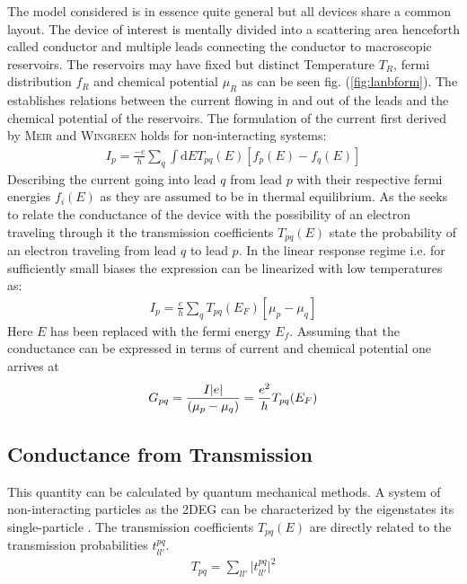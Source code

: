 The model considered is in essence quite general but all devices share a common layout. The device of interest is mentally divided into a scattering area henceforth called conductor and multiple leads connecting the conductor to macroscopic reservoirs. The reservoirs may have fixed but distinct Temperature $T_R$, fermi distribution $f_R$ and chemical potential $\mu_R$ as can be seen fig. (\ref{fig:lanbform}).
The \lanbform{} establishes relations between the current flowing in and out of the leads and the chemical potential of the reservoirs. The formulation of the current first derived by \textsc{Meir} and \textsc{Wingreen}\cite{} holds for non-interacting systems:
\begin{align}
I_p=\frac{-e}{h} \sum_q \int \text{d}E T_{pq}(E) [f_p(E) - f_q(E)]
\label{eqn:current}
\end{align}
Describing the current going into lead $q$ from lead $p$ with their respective fermi energies $f_i(E)$ as they are assumed to be in thermal equilibrium. 
As the \lanbform{} seeks to relate the conductance of the device with the possibility of an electron traveling through it the transmission coefficients $T_{pq}(E)$ state the probability of an electron traveling from lead $q$ to lead $p$. 
In the linear response regime i.e. for sufficiently small biases the expression can be linearized with low temperatures as:
\begin{align}
I_p=\frac{e}{h} \sum_q T_{pq}(E_F) [\mu_p - \mu_q]
\label{eqn:currentlin}
\end{align}
Here $E$ has been replaced with the fermi energy $E_f$.
Assuming that the conductance can be expressed in terms of current and chemical potential one arrives at
\begin{align}
G_{pq}=\frac{I\lvert e\rvert}{(\mu_p - \mu_q)}=\frac{e^2}{h} T_{pq}(E_F)
\label{eqn:conductance}
\end{align}
\subsection{Conductance from Transmission}
This quantity can be calculated by quantum mechanical methods. A system of non-interacting particles as the 2DEG can be characterized by the eigenstates its single-particle \hamil{}. The transmission coefficients $T_{pq}(E)$ are directly related to the transmission probabilities $t^{pq}_{ll'}$.
\begin{align}
T_{pq} = \sum_{ll'} \lvert t^{pq}_{ll'} \rvert ^2
\label{eqn:transcoeff}
\end{align}
 

